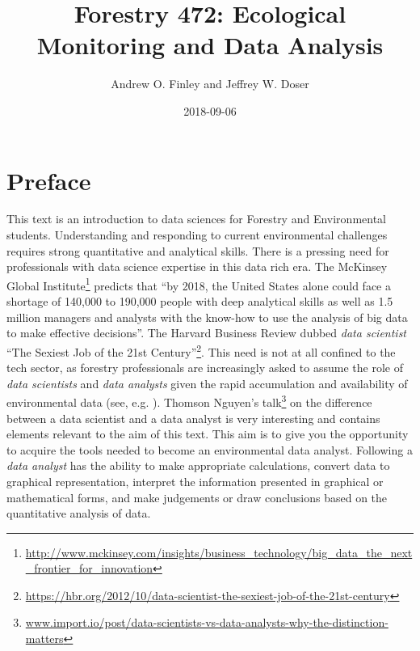 \documentclass[]{krantz}
\title{Forestry 472: Ecological Monitoring and Data Analysis}
\author{Andrew O. Finley and Jeffrey W. Doser}
\date{2018-09-06}
\renewcommand{\href}[2]{#2\footnote{\url{#1}}}
\theoremstyle{definition}
\theoremstyle{definition}
\theoremstyle{definition}
\theoremstyle{remark}
\begin{document}
\maketitle


\thispagestyle{empty}

\setlength{\abovedisplayskip}{-5pt}
\setlength{\abovedisplayshortskip}{-5pt}

\mainmatter

{
\hypersetup{linkcolor=black}
\setcounter{tocdepth}{2}
\tableofcontents
}
\listoftables
\listoffigures
\chapter*{Preface}\label{preface}


This text is an introduction to data sciences for Forestry and
Environmental students. Understanding and responding to current
environmental challenges requires strong quantitative and analytical
skills. There is a pressing need for professionals with data science
expertise in this data rich era. The
\href{http://www.mckinsey.com/insights/business_technology/big_data_the_next_frontier_for_innovation}{McKinsey
Global Institute} predicts that ``by 2018, the United States alone could
face a shortage of 140,000 to 190,000 people with deep analytical skills
as well as 1.5 million managers and analysts with the know-how to use
the analysis of big data to make effective decisions''. The Harvard
Business Review dubbed \emph{data scientist}
\href{https://hbr.org/2012/10/data-scientist-the-sexiest-job-of-the-21st-century}{``The
Sexiest Job of the 21st Century''}. This need is not at all confined to
the tech sector, as forestry professionals are increasingly asked to
assume the role of \emph{data scientists} and \emph{data analysts} given
the rapid accumulation and availability of environmental data (see, e.g.
\citet{Schimel2015}).
\href{www.import.io/post/data-scientists-vs-data-analysts-why-the-distinction-matters}{Thomson
Nguyen's talk} on the difference between a data scientist and a data
analyst is very interesting and contains elements relevant to the aim of
this text. This aim is to give you the opportunity to acquire the tools
needed to become an environmental data analyst. Following
\citet{Bravo16} a \emph{data analyst} has the ability to make
appropriate calculations, convert data to graphical representation,
interpret the information presented in graphical or mathematical forms,
and make judgements or draw conclusions based on the quantitative
analysis of data.
\end{document}
